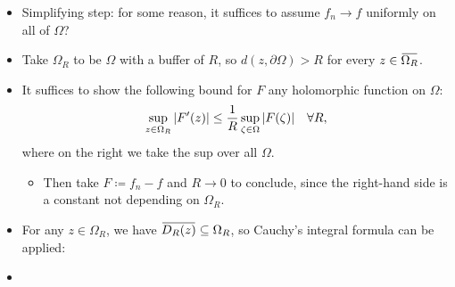 \begin{solution}

\envlist

\begin{itemize}
\item
  Simplifying step: for some reason, it suffices to assume \(f_n\to f\)
  uniformly on all of \(\Omega\)?
\item
  Take \(\Omega_R\) to be \(\Omega\) with a buffer of \(R\), so
  \(d(z, {{\partial}}\Omega) > R\) for every
  \(z \in \mkern 1.5mu\overline{\mkern-1.5mu\Omega_R\mkern-1.5mu}\mkern 1.5mu\).
\item
  It suffices to show the following bound for \(F\) any holomorphic
  function on \(\Omega\):
  \begin{align*}
  \sup_{z\in \Omega_R} {\left\lvert {F'(z)} \right\rvert} \leq {1\over R} \sup_{\zeta \in \Omega} {\left\lvert {F(\zeta)} \right\rvert} && \forall R
  ,\end{align*}
  where on the right we take the sup over all \(\Omega\).

  \begin{itemize}
  \tightlist
  \item
    Then take \(F \coloneqq f_n-f\) and \(R\to 0\) to conclude, since
    the right-hand side is a constant not depending on \(\Omega_R\).
  \end{itemize}
\item
  For any \(z\in \Omega_R\), we have
  \(\mkern 1.5mu\overline{\mkern-1.5muD_R(z)\mkern-1.5mu}\mkern 1.5mu \subseteq \Omega_R\),
  so Cauchy's integral formula can be applied:
\item


\end{itemize}
\end{solution}
